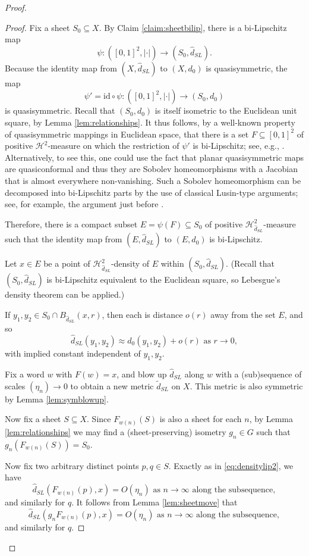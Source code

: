 \documentclass{amsart}
\theoremstyle{plain}
\theoremstyle{definition}
\numberwithin{equation}{section}
\numberwithin{theorem}{section}
\begin{document}
\begin{proof}
\begin{proof}
Fix a sheet $S_0\subseteq X$. By Claim \ref{claim:sheetbilip}, there is a bi-Lipschitz map 
\[
\psi\colon ([0,1]^2,|\cdot|) \rightarrow (S_0,\hat{d}_{SL}).
\]
Because the identity map from $(X,\hat{d}_{SL})$ to $(X,d_0)$ is quasisymmetric, the map
\[
\psi' = \text{id} \circ \psi \colon ([0,1]^2,|\cdot|) \rightarrow (S_0,d_0)
\]
is quasisymmetric. Recall that $(S_0,d_0)$ is itself isometric to the Euclidean unit square, by Lemma \ref{lem:relationships}.  It thus  follows, by a well-known property of quasisymmetric mappings in Euclidean space, that there is a set $F\subseteq [0,1]^2$ of positive $\mathcal{H}^2$-measure on which the restriction of $\psi'$ is bi-Lipschitz; see, e.g., \cite[Proposition 1.6]{A}. Alternatively, to see this, one could use the fact that planar quasisymmetric maps are quasiconformal and thus they are Sobolev homeomorphisms with a Jacobian that is almost everywhere non-vanishing. Such a Sobolev homeomorphism can be decomposed into bi-Lipschitz parts by the use of classical Lusin-type arguments; see, for example, the argument just before \cite[Lemma 10.7]{HKS}.

Therefore, there is a compact subset $E=\psi(F)\subseteq S_0$ of positive $\mathcal{H}^2_{\hat{d}_{SL}}$-measure such that the identity map from $(E,\hat{d}_{SL})$ to $(E,d_0)$ is bi-Lipschitz.

Let $x\in E$ be a point of $\mathcal{H}^2_{\hat{d}_{SL}}$-density of $E$ within $(S_0, \hat{d}_{SL})$. (Recall that $(S_0,\hat{d}_{SL})$ is bi-Lipschitz equivalent to the Euclidean square, so Lebesgue's density theorem can be applied.) 

If $y_1,y_2 \in S_0 \cap B_{\hat{d}_{SL}}(x,r)$, then each is distance $o(r)$ away from the set $E$, and so
\begin{equation}\label{eq:densitybilip}
 \hat{d}_{SL}(y_1, y_2) \approx d_0(y_1, y_2) +o(r) \text{ as } r\rightarrow 0,
\end{equation}
with implied constant independent of $y_1, y_2$. 


Fix a word $w$ with $F(w)=x$, and blow up $\hat{d}_{SL}$ along $w$ with a (sub)sequence of scales $(\eta_n)\rightarrow 0$ to obtain a new metric $\tilde{d}_{SL}$ on $X$. This metric is also symmetric by Lemma \ref{lem:symblowup}. 

Now fix a sheet $S\subseteq X$. Since $F_{w(n)}(S)$ is also a sheet for each $n$, by Lemma \ref{lem:relationships} we may find a (sheet-preserving) isometry $g_n\in G$ such that $g_n(F_{w(n)}(S))=S_0$.

Now fix two arbitrary distinct points $p,q\in S$. Exactly as in \eqref{eq:densitylip2}, we have
$$ \hat{d}_{SL}(F_{w(n)}(p), x) = O(\eta_n) \text{ as } n\rightarrow\infty \text{ along the subsequence},$$
and similarly for $q$. It follows from Lemma \ref{lem:sheetmove} that
\begin{equation}\label{eq:sheetmove}
\hat{d}_{SL}(g_n F_{w(n)}(p), x) = O(\eta_n) \text{ as } n\rightarrow\infty \text{ along the subsequence},
\end{equation}
and similarly for $q$.


\end{proof}
\end{proof}
\end{document}
